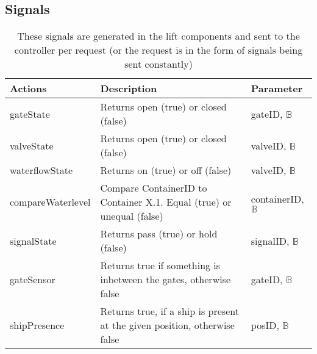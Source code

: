 		\subsection{Signals}
		\begin{table}[htbp]
			\centering
			\caption{These signals are generated in the lift components and sent to the controller per request (or the request is in the form of signals being sent constantly)}
			\begin{tabular}{lp{3in}l}
				\toprule
				\textbf{Actions} & \textbf{Description} & \textbf{Parameter} \\
				\hline
				gateState & Returns open (true) or closed (false) & gateID, $ \mathbb{B} $ \\
				valveState & Returns open (true) or closed (false) & valveID, $ \mathbb{B} $ \\
				waterflowState & Returns on (true) or off (false) & valveID, $ \mathbb{B} $ \\
				compareWaterlevel & Compare ContainerID to Container X.1. Equal (true) or unequal (false) & containerID, $ \mathbb{B} $ \\
				signalState & Returns pass (true) or hold (false) & signalID, $ \mathbb{B} $ \\
				gateSensor &  Returns true if something is inbetween the gates, otherwise false & gateID, $ \mathbb{B} $ \\
				shipPresence  & Returns true, if a ship is present at the given position, otherwise false & posID, $ \mathbb{B} $ \\
				\bottomrule
			\end{tabular}%
				\label{tab:addlabel}%
				\end{table}%
				
				
